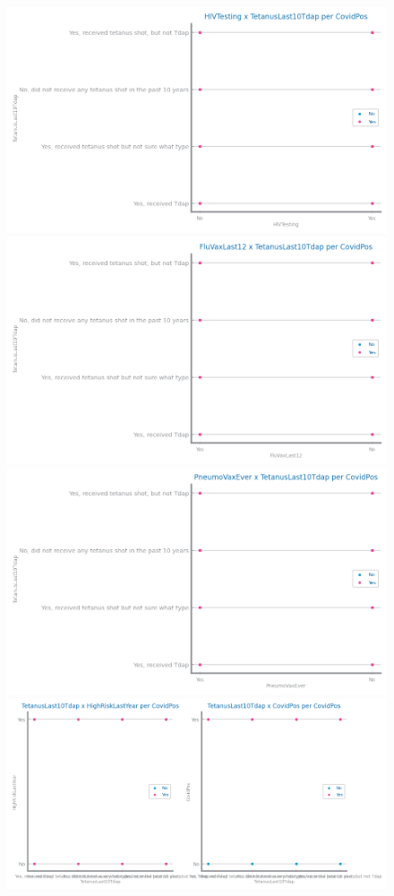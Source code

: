 \documentclass[10pt]{extarticle}
\begin{document}
\begin{figure}[H]
\includegraphics[scale=0.05]{images/dataset1/data_profiling/CovidPos_sparsity_HIVTesting_per_class.png}
\includegraphics[scale=0.05]{images/dataset1/data_profiling/CovidPos_sparsity_FluVaxLast12_per_class.png}
\includegraphics[scale=0.05]{images/dataset1/data_profiling/CovidPos_sparsity_PneumoVaxEver_per_class.png}
\includegraphics[scale=0.05]{images/dataset1/data_profiling/CovidPos_sparsity_TetanusLast10Tdap_per_class.png}

\end{figure}
\end{document}
